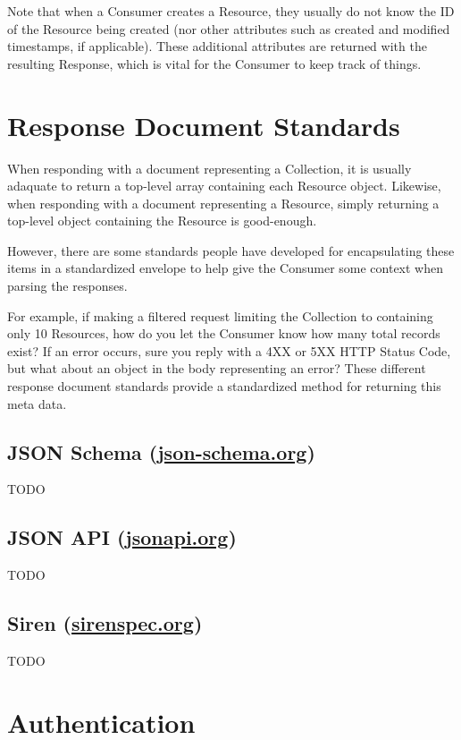 \documentclass{book}
\begin{document}
Note that when a Consumer creates a Resource, they usually do not know the ID of the Resource being created (nor other attributes such as created and modified timestamps, if applicable). These additional attributes are returned with the resulting Response, which is vital for the Consumer to keep track of things.


\chapter{Response Document Standards}

When responding with a document representing a Collection, it is usually adaquate to return a top-level array containing each Resource object. Likewise, when responding with a document representing a Resource, simply returning a top-level object containing the Resource is good-enough.

However, there are some standards people have developed for encapsulating these items in a standardized envelope to help give the Consumer some context when parsing the responses.

For example, if making a filtered request limiting the Collection to containing only 10 Resources, how do you let the Consumer know how many total records exist? If an error occurs, sure you reply with a 4XX or 5XX HTTP Status Code, but what about an object in the body representing an error? These different response document standards provide a standardized method for returning this meta data.

\section{JSON Schema (\href{http://json-schema.org/}{json-schema.org})}

TODO

\section{JSON API (\href{http://jsonapi.org/}{jsonapi.org})}

TODO

\section{Siren (\href{http://sirenspec.org}{sirenspec.org})}

TODO


\chapter{Authentication}
\end{document}
